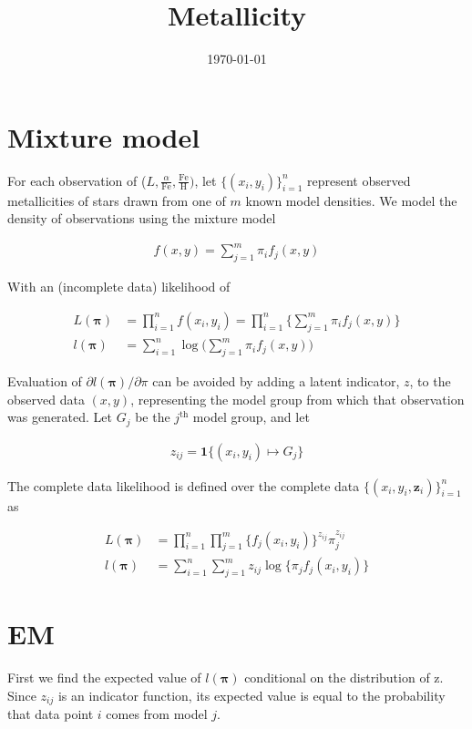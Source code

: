 \documentclass[12pt]{amsart}
\title{Metallicity}
\author{\today}
\newcommand{\vect}[1]{\boldsymbol{\mathbf{#1}}}
\newcommand{\eqn}[1]{\begin{align*}
#1
\end{align*}}
\newcommand{\bl}{\big\{}
\newcommand{\br}{\big\}}
\newcommand{\Bl}{\Big\{}
\newcommand{\Br}{\Big\}}
\newcommand{\indicator}{\mathbf{1}}
\newcommand{\fab}{f_j}
\newcommand{\llp}{l(\vect{\pi})}
\newcommand{\sumn}{\sum^n_{i=1}}
\newcommand{\summ}{\sum^m_{j=1}}
\begin{document}
\maketitle






\section{Mixture model}

For each observation of ($L, \frac{\alpha}{\text{Fe}}, \frac{\text{Fe}}{\text{H}})$, let $\bl (x_i,y_i) \br^n_{i=1}$ represent observed metallicities of stars drawn from one of $m$ known model densities. We model the density of observations using the mixture model

\eqn{
	f(x,y) = \summ \pi_i \fab(x,y)
}

With an (incomplete data) likelihood of

\eqn{
	L(\vect{\pi}) &= \prod^n_{i=1} f(x_i,y_i)	 = \prod^n_{i=1} \Bl  \summ \pi_i \fab(x,y)  \Br	\\
	\llp &= \sumn \log \Big( \summ \pi_i \fab(x,y)  \Big)
}

Evaluation of $\partial l(\vect{\pi})/\partial \pi$ can be avoided by adding a latent indicator, $z$, to the observed data $(x,y)$, representing the model group from which that observation was generated. Let $G_j$ be the $j^\text{th}$ model group, and let

\eqn{z_{ij} = \indicator \bl (x_i,y_i) \mapsto G_j \br}


The complete data likelihood is defined over the complete data $\bl (x_i,y_i,\vect{z}_i) \br^n_{i=1}$ as

\eqn{
	L(\vect{\pi}) &= \prod^n_{i=1} \prod^m_{j=1} \Bl \fab(x_i,y_i) \Br ^{z_{ij}} \pi_j^{z_{ij}}	\\
	\llp &= \sumn \summ z_{ij}  \log \bl \pi_j  \fab(x_i,y_i) \br
}





\clearpage
\section{EM}

First we find the expected value of $\llp$ conditional on the distribution of z. Since $z_{ij}$ is an indicator function, its expected value is equal to the probability that data point $i$ comes from model $j$.
\end{document}
